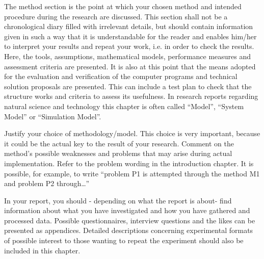 The method section is the point at which your chosen method and intended procedure during the research are discussed. This section shall not be a chronological diary filled with irrelevant details, but should contain information given in such a way that it is understandable for the reader and enables him/her to interpret your results and repeat your work, i.e. in order to check the results. Here, the tools, assumptions, mathematical models, performance measures and assessment criteria are presented. It is also at this point that the means adopted for the evaluation and verification of the computer programs and technical solution proposals are presented. This can include a test plan to check that the structure works and criteria to assess its usefulness. In research reports regarding natural science and technology this chapter is often called “Model”, “System Model” or “Simulation Model”.

Justify your choice of methodology/model. This choice is very important, because it could be the actual key to the result of your research. Comment on the method's possible weaknesses and problems that may arise during actual implementation. Refer to the problem wording in the introduction chapter. It is possible, for example, to write “problem P1 is attempted through the method M1 and problem P2 through…” 

In your report, you should - depending on what the report is about- find information about what you have investigated and how you have gathered and processed data. Possible questionnaires, interview questions and the likes can be presented as appendices. Detailed descriptions concerning experimental formats of possible interest to those wanting to repeat the experiment should also be included in this chapter.
\fi
